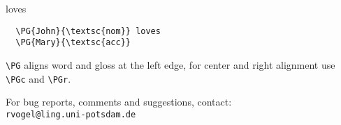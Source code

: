 \documentclass[12pt,a4paper]{article}
\begin{document}
\begin{minipage}[t]{3cm}
   loves 
\end{minipage}
\begin{minipage}[t]{7cm}
\begin{verbatim}
  \PG{John}{\textsc{nom}} loves 
  \PG{Mary}{\textsc{acc}}
\end{verbatim}
\end{minipage}

\verb|\PG| aligns word and gloss at the left edge, for center and right
alignment use \verb|\PGc| and \verb|\PGr|. 


\bigskip

For bug reports, comments and suggestions, contact:\\
\texttt{rvogel@ling.uni-potsdam.de}
\end{document}
